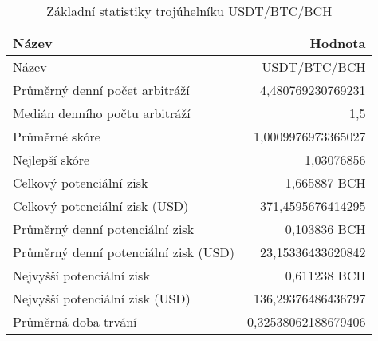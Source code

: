 \begin{table}\centering
\caption{Základní statistiky trojúhelníku USDT/BTC/BCH}
\label{USDTBTCBCH_stats}
\begin{tabular}{|| l | r ||}
\hline Název & Hodnota \\ 
\hline\hline Název & USDT/BTC/BCH \\ 
\hline Průměrný denní počet arbitráží & 4,480769230769231 \\ 
\hline Medián denního počtu arbitráží & 1,5 \\ 
\hline Průměrné skóre & 1,0009976973365027 \\ 
\hline Nejlepší skóre & 1,03076856 \\ 
\hline Celkový potenciální zisk & 1,665887 BCH \\ 
\hline Celkový potenciální zisk (USD) & 371,4595676414295 \\ 
\hline Průměrný denní potenciální zisk & 0,103836 BCH \\ 
\hline Průměrný denní potenciální zisk (USD) & 23,15336433620842 \\ 
\hline Nejvyšší potenciální zisk & 0,611238 BCH \\ 
\hline Nejvyšší potenciální zisk (USD) & 136,29376486436797 \\ 
\hline Průměrná doba trvání & 0,32538062188679406 \\ 
\hline
\end{tabular}
\end{table}